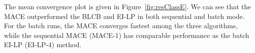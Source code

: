 The mean convergence plot is given in Figure~\ref{fig:resClassE}. We can see
that the MACE outperformed the BLCB and EI-LP in both sequential and batch
mode. For the batch runs, the MACE converges fastest among the three
algorithms, while the sequential MACE (MACE-1) has comparable performance as
the batch EI-LP (EI-LP-4) method.

